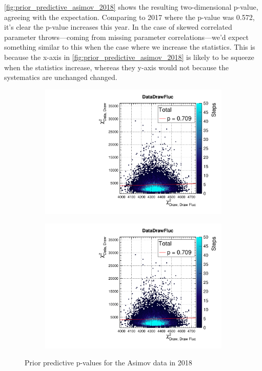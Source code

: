 \autoref{fig:prior_predictive_asimov_2018} shows the resulting two-dimensional p-value, agreeing with the expectation. Comparing to 2017 where the p-value was 0.572, it's clear the p-value increases this year. In the case of skewed correlated parameter throws---coming from missing parameter correlations---we'd expect something similar to this when the case where we increase the statistics. This is because the x-axis in \autoref{fig:prior_predictive_asimov_2018} is likely to be squeeze when the statistics increase, whereas they y-axis would not because the systematics are unchanged changed.
\begin{figure}[h]
	\begin{subfigure}[t]{0.49\textwidth}
		\includegraphics[width=\textwidth, trim={0mm 0mm 0mm 11mm}, clip,page=1]{figures/mach3/2018/asimov/pred/17May_MultiPi_CovFix_Final_pospred_PriorPred_procs.pdf}
	\end{subfigure}
	\begin{subfigure}[t]{0.49\textwidth}
		\includegraphics[width=\textwidth, trim={0mm 0mm 0mm 11mm}, clip,page=2]{figures/mach3/2018/asimov/pred/17May_MultiPi_CovFix_Final_pospred_PriorPred_procs.pdf}
	\end{subfigure}
	\caption{Prior predictive p-values for the Asimov data in 2018}
	\label{fig:prior_predictive_asimov_2018}
\end{figure}

